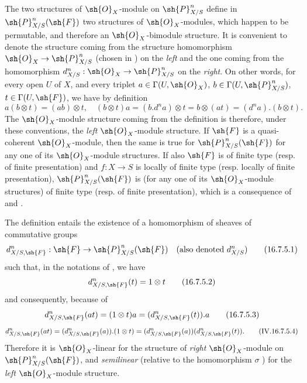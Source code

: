 \begin{env}[16.7.4]
\label{IV.16.7.4}
The two structures of $\sh{O}_X$-module on $\sh{P}_{X/S}^n$ define in $\sh{P}_{X/S}^n(\sh{F})$ two structures of $\sh{O}_X$-modules, which happen to be permutable, and therefore an $\sh{O}_X$-bimodule structure.
It is convenient to denote the structure coming from the structure homomorphism $\sh{O}_X \to \sh{P}_{X/S}^n$ (chosen in ) on the \emph{left} and the one coming from the homomorphism $d_{X/S}^n: \sh{O}_X \to \sh{P}_{X/S}^n$ on the \emph{right}.
On other words, for every open $U$ of $X$, and every triplet $a \in \Gamma(U, \sh{O}_X)$, $b \in \Gamma(U, \sh{P}_{X/S}^n)$, $t \in \Gamma(U, \sh{F})$, we have by definition
\[
  \label{IV.16.7.4.1}
  a(b \otimes t) = (ab) \otimes t, \quad (b \otimes t)a = (b.d^n a) \otimes t = b \otimes (at) = (d^na).(b \otimes t).
  \tag{16.7.4.1}
\]
The $\sh{O}_X$-module structure coming from the definition  is therefore, under these conventions, the \emph{left} $\sh{O}_X$-module structure.
If $\sh{F}$ is a quasi-coherent $\sh{O}_X$-module, then the same is true for $\sh{P}_{X/S}^n(\sh{F})$ for any one of its $\sh{O}_X$-module structures.
If also $\sh{F}$ is of finite type (resp. of finite presentation) and $f:X \to S$ is locally of finite type (resp. locally of finite presentation), $\sh{P}_{X/S}^n(\sh{F})$ is (for any one of its $\sh{O}_X$-module structures) of finite type (resp. of finite presentation), which is a consequence of  and .
\end{env}

\begin{env}[16.7.5]
\label{IV.16.7.5}
The definition  entails the existence of a homomorphism of sheaves of commutative groups
\[
  \label{IV.16.7.5.1}
  d_{X/S, \sh{F}}^n: \sh{F} \to \sh{P}_{X/S}^n(\sh{F}) \quad (\text{also denoted } d_{X/S}^n)
  \tag{16.7.5.1}
\]
such that, in the notations of , we have
\[
  \label{IV.16.7.5.2}
  d_{X/S, \sh{F}}^n(t) = 1 \otimes t
  \tag{16.7.5.2}
\]
and consequently, because of 
\[
  \label{IV.16.7.5.3}
  d_{X/S, \sh{F}}^n(at) = (1 \otimes t) a = (d_{X/S, \sh{F}}^n(t)).a
  \tag{16.7.5.3}
\]
\[
  \label{IV.IV.16.7.5.4}
  d_{X/S, \sh{F}}^n(at) = (d_{X/S, \sh{F}}^n(a)).(1 \otimes t) = (d_{X/S, \sh{F}}^n(a))(d_{X/S, \sh{F}}^n(t)).
  \tag{IV.16.7.5.4}
\]
Therefore it is $\sh{O}_X$-linear for the structure of \emph{right} $\sh{O}_X$-module on $\sh{P}_{X/S}^n(\sh{F})$, and \emph{semilinear} (relative to the homomorphism $\sigma$ ) for the \emph{left} $\sh{O}_X$-module structure.
\end{env}

